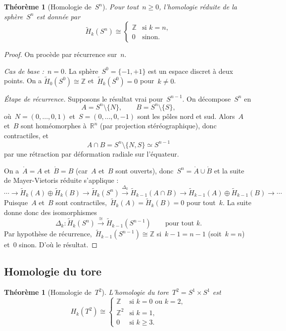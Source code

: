 \documentclass[12pt,a4paper,openany]{book}
\theoremstyle{definition}
\theoremstyle{plain}
\newtheorem{theoreme}[definition]{Théorème}
\theoremstyle{remark}
\newcommand{\Z}{\mathbb{Z}}
\newcommand{\R}{\mathbb{R}}
\begin{document}
\begin{theoreme}[Homologie de~$S^n$]\label{thm:homologie-spheres}
Pour tout~$n \geqslant 0$, l'homologie réduite de la sphère~$S^n$ est donnée par
\[
  \widetilde{H}_k(S^n) \cong
  \begin{cases}
    \Z & \text{si } k = n,\\
    0  & \text{sinon.}
  \end{cases}
\]
\end{theoreme}

\begin{proof}
On procède par récurrence sur~$n$.

\medskip
\noindent\textit{Cas de base :~$n = 0$.}
La sphère~$S^0 = \{-1, +1\}$ est un espace discret à deux points. On a
$\widetilde{H}_0(S^0) \cong \Z$ et~$\widetilde{H}_k(S^0) = 0$ pour~$k \neq 0$.

\medskip
\noindent\textit{Étape de récurrence.}
Supposons le résultat vrai pour~$S^{n-1}$. On décompose~$S^n$ en
\[
  A = S^n \setminus \{N\}, \qquad B = S^n \setminus \{S\},
\]
où~$N = (0, \ldots, 0, 1)$ et~$S = (0, \ldots, 0, -1)$ sont les pôles nord et sud.
Alors~$A$ et~$B$ sont homéomorphes à~$\R^n$ (par projection stéréographique),
donc contractiles, et
\[
  A \cap B = S^n \setminus \{N, S\} \simeq S^{n-1}
\]
par une rétraction par déformation radiale sur l'équateur.

On a~$\mathring{A} = A$ et~$\mathring{B} = B$ (car~$A$ et~$B$ sont ouverts),
donc~$S^n = \mathring{A} \cup \mathring{B}$ et la suite de Mayer-Vietoris
réduite s'applique :
\[
  \cdots \to \widetilde{H}_k(A) \oplus \widetilde{H}_k(B)
  \to \widetilde{H}_k(S^n)
  \xrightarrow{\Delta_k}
  \widetilde{H}_{k-1}(A \cap B)
  \to \widetilde{H}_{k-1}(A) \oplus \widetilde{H}_{k-1}(B) \to \cdots
\]
Puisque~$A$ et~$B$ sont contractiles,~$\widetilde{H}_k(A) = \widetilde{H}_k(B) = 0$
pour tout~$k$. La suite donne donc des isomorphismes
\[
  \Delta_k \colon \widetilde{H}_k(S^n) \xrightarrow{\;\cong\;} \widetilde{H}_{k-1}(S^{n-1})
  \qquad \text{pour tout } k.
\]
Par hypothèse de récurrence,~$\widetilde{H}_{k-1}(S^{n-1}) \cong \Z$ si~$k-1 = n-1$
(soit~$k = n$) et~$0$ sinon. D'où le résultat.
\end{proof}

\subsection{Homologie du tore}\label{subsec:homologie-tore}

\begin{theoreme}[Homologie de~$T^2$]\label{thm:homologie-tore}
L'homologie du tore~$T^2 = S^1 \times S^1$ est
\[
  H_k(T^2) \cong
  \begin{cases}
    \Z   & \text{si } k = 0 \text{ ou } k = 2,\\
    \Z^2 & \text{si } k = 1,\\
    0    & \text{si } k \geqslant 3.
  \end{cases}
\]
\end{theoreme}
\end{document}
